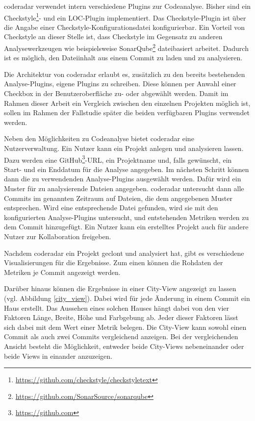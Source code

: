 \documentclass[
	oneside,  %
	ngerman, 
	final, 
	11pt, 
	a4paper, 
	1.1headlines, 
	headinclude=false, 
	footinclude=false, 
	mpinclude=false, 
	pagesize, 
	onecolumn, 
	titlepage, 
	parskip=half, 
	headsepline, 
	chapterprefix=false, 
	version=first, 
	listof=totoc, 
	bibliography=totoc, 
	toc=graduated, 
	fleqn
]{scrbook}
\begin{document}
coderadar verwendet intern verschiedene Plugins zur Codeanalyse.
Bisher sind ein Checkstyle\footnote{\url{https://github.com/checkstyle/checkstyletext}}- und ein \acf{LOC}-Plugin implementiert.
Das Checkstyle-Plugin ist über die Angabe einer Checkstyle-Konfigurationsdatei konfigurierbar.
Ein Vorteil von Checkstyle an dieser Stelle ist, dass Checkstyle im Gegensatz zu anderen Analysewerkzeugen wie beispielsweise SonarQube\footnote{\url{https://github.com/SonarSource/sonarqube}} dateibasiert arbeitet.
Dadurch ist es möglich, den Dateiinhalt aus einem Commit zu laden und zu analysieren.

Die Architektur von coderadar erlaubt es, zusätzlich zu den bereits bestehenden Analyse-Plugins, eigene Plugins zu schreiben.
Diese können per Anwahl einer Checkbox in der Benutzeroberfläche zu- oder abgewählt werden.
Damit im Rahmen dieser Arbeit ein Vergleich zwischen den einzelnen Projekten möglich ist, sollen im Rahmen der Fallstudie später die beiden verfügbaren Plugins verwendet werden.

Neben den Möglichkeiten zu Codeanalyse bietet coderadar eine Nutzerverwaltung.
Ein Nutzer kann ein Projekt anlegen und analysieren lassen.
Dazu werden eine GitHub\footnote{\url{https://github.com}}-URL, ein Projektname und, falls gewünscht, ein Start- und ein Enddatum für die Analyse angegeben.
Im nächsten Schritt können dann die zu verwendenden Analyse-Plugins ausgewählt werden.
Dafür wird ein Muster für zu analysierende Dateien angegeben.
coderadar untersucht dann alle Commits im genannten Zeitraum auf Dateien, die dem angegebenen Muster entsprechen.
Wird eine entsprechende Datei gefunden, wird sie mit den konfigurierten Analyse-Plugins untersucht, und entstehenden Metriken werden zu dem Commit hinzugefügt.
Ein Nutzer kann ein erstelltes Projekt auch für andere Nutzer zur Kollaboration freigeben.

Nachdem coderadar ein Projekt geclont und analysiert hat, gibt es verschiedene Visualisierungen für die Ergebnisse.
Zum einen können die Rohdaten der Metriken je Commit angezeigt werden.

Darüber hinaus können die Ergebnisse in einer \glqq City-View\grqq{} angezeigt zu lassen (vgl. Abbildung \ref{city_view}).
Dabei wird für jede Änderung in einem Commit ein \glqq Haus\grqq{} erstellt.
Das Aussehen eines solchen Hauses hängt dabei von den vier Faktoren Länge, Breite, Höhe und Farbgebung ab.
Jeder dieser Faktoren lässt sich dabei mit dem Wert einer Metrik belegen.
Die City-View kann sowohl einen Commit als auch zwei Commits vergleichend anzeigen.
Bei der vergleichenden Ansicht besteht die Möglichkeit, entweder beide City-Views nebeneinander oder beide Views in einander anzuzeigen.
\end{document}
